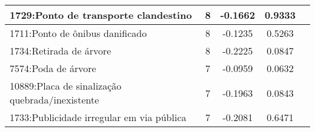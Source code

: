 \begin{table}[htbp]
\begin{tabular}{|l|c|c|c|c|}
		\hline
		1729:Ponto de transporte clandestino            & 8                & -0.1662        & 0.9333           \\
		\hline
		1711:Ponto de ônibus danificado                 & 8                & -0.1235        & 0.5263           \\
		\hline
		1734:Retirada de árvore                         & 8                & -0.2225        & 0.0847           \\
		\hline
		7574:Poda de árvore                             & 7                & -0.0959        & 0.0632           \\
		\hline
		10889:Placa de sinalização quebrada/inexistente & 7                & -0.1963        & 0.0843           \\
		\hline
		1733:Publicidade irregular em via pública       & 7                & -0.2081        & 0.6471           \\
		\hline
	\end{tabular}
\end{table}


